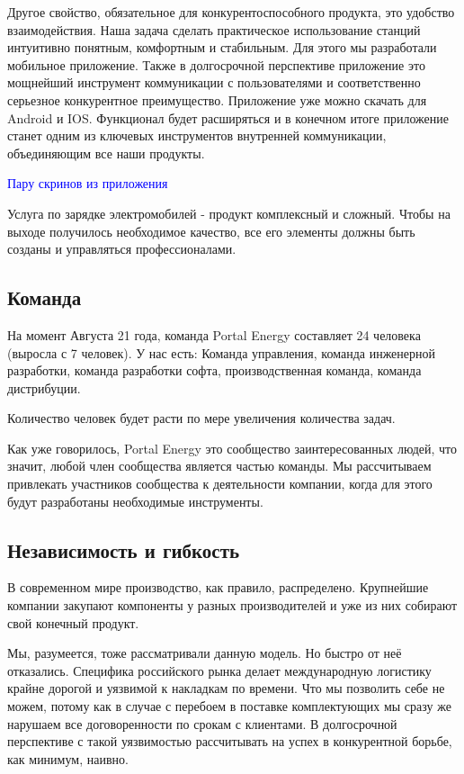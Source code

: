\documentclass[a4paper,12pt]{report}
\begin{document}
Другое свойство, обязательное для конкурентоспособного продукта, это удобство взаимодействия. Наша задача сделать практическое использование станций интуитивно понятным, комфортным и стабильным. Для этого мы разработали мобильное приложение. Также в долгосрочной перспективе приложение это мощнейший инструмент коммуникации с пользователями и соответственно серьезное конкурентное преимущество. Приложение уже можно скачать для Android и IOS. Функционал будет расширяться и в конечном итоге приложение станет одним из ключевых инструментов внутренней коммуникации, объединяющим все наши продукты. 

\textcolor{blue}{Пару скринов из приложения}

Услуга по зарядке электромобилей - продукт комплексный и сложный. Чтобы на выходе получилось необходимое качество, все его элементы должны быть созданы и управляться профессионалами. 


\subsection{Команда}

На момент Августа 21 года, команда Portal Energy составляет 24 человека (выросла с 7 человек). У нас есть:
Команда управления, 
команда инженерной разработки, 
команда разработки софта, 
производственная команда,
команда дистрибуции. 

Количество человек будет расти по мере увеличения количества задач. 

Как уже говорилось, Portal Energy это сообщество заинтересованных людей, что значит, любой член сообщества является частью команды. Мы рассчитываем привлекать участников сообщества к деятельности компании, когда для этого будут разработаны необходимые инструменты.

\subsection{Независимость и гибкость}

В современном мире производство, как правило, распределено. Крупнейшие компании закупают компоненты у разных производителей и уже из них собирают свой конечный продукт. 

Мы, разумеется, тоже рассматривали данную модель. Но быстро от неё отказались. Специфика российского рынка делает международную логистику крайне дорогой и уязвимой к накладкам по времени. Что мы позволить себе не можем, потому как в случае с перебоем в поставке комплектующих мы сразу же нарушаем все договоренности по срокам с клиентами. В долгосрочной перспективе с такой уязвимостью рассчитывать на успех в конкурентной борьбе, как минимум, наивно. 
\end{document}
